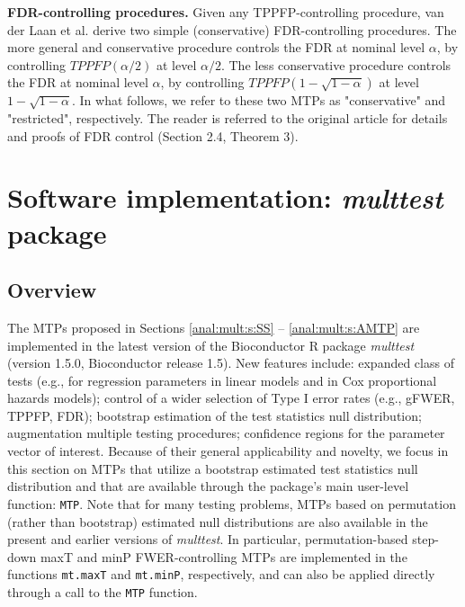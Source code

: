 \documentclass[11pt]{article}
\newcommand{\Rpackage}[1]{\textit{#1}}
\newcommand{\Robject}[1]{\texttt{#1}}
\begin{document}
\noindent
{\bf FDR-controlling procedures.}
Given any TPPFP-controlling procedure, van der Laan et al. \cite{vdLaanetalMT3SAGMB04} derive two simple (conservative) FDR-controlling procedures. 
The more general and conservative procedure controls the FDR at nominal level $\alpha$, by controlling $TPPFP(\alpha/2)$ at level $\alpha/2$. 
The less conservative procedure controls the FDR at nominal level $\alpha$, by controlling $TPPFP(1 - \sqrt{1-\alpha})$ at level $1 - \sqrt{1-\alpha}$.
In what follows, we refer to these two MTPs as "conservative" and "restricted", respectively.
The reader is referred to the original article for details and proofs of FDR control (Section 2.4, Theorem 3).
 
\section{Software implementation: \Rpackage{multtest} package}
\label{anal:mult:s:software}

\subsection{Overview}

The MTPs proposed in Sections \ref{anal:mult:s:SS} -- \ref{anal:mult:s:AMTP} are implemented in the latest version of the Bioconductor R package \Rpackage{multtest} (version 1.5.0, Bioconductor release 1.5). 
New features include: 
expanded class of tests (e.g., for regression parameters in linear models and in Cox proportional hazards models);
control of a wider selection of Type I error rates (e.g., gFWER, TPPFP, FDR); 
bootstrap estimation of the test statistics null distribution; 
augmentation multiple testing procedures;  
confidence regions for the parameter vector of interest.
Because of their general applicability and novelty, we focus in this section on MTPs that utilize a bootstrap estimated test statistics null distribution and that are available through the package's main user-level function: \Robject{MTP}.
Note that for many testing problems, MTPs based on permutation (rather than bootstrap) estimated null distributions are also available in the present and earlier versions of \Rpackage{multtest}.
In particular, permutation-based step-down maxT and minP FWER-controlling MTPs are implemented in the functions \Robject{mt.maxT} and \Robject{mt.minP}, respectively, and can also be applied directly through a call to the \Robject{MTP} function.
\end{document}
